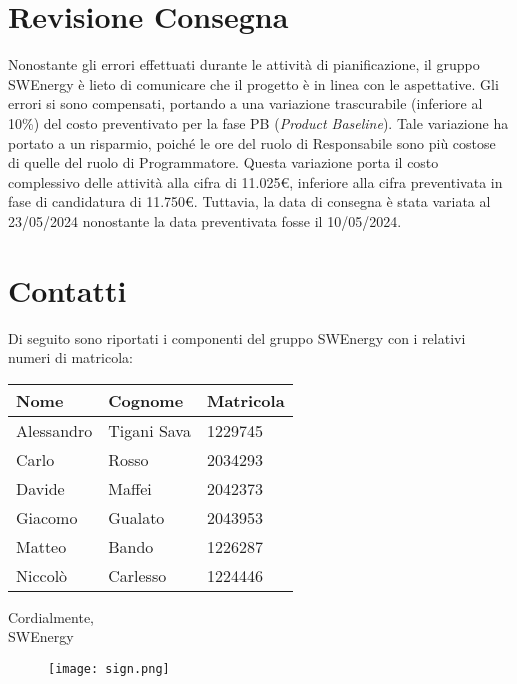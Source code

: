 \section{Revisione Consegna}

Nonostante gli errori effettuati durante le attività di pianificazione, il gruppo SWEnergy è lieto di comunicare che il progetto è in linea con le aspettative. 
Gli errori si sono compensati, portando a una variazione trascurabile (inferiore al 10\%) del costo preventivato per la fase PB (\textit{Product Baseline}). 
Tale variazione ha portato a un risparmio, poiché le ore del ruolo di Responsabile sono più costose di quelle del ruolo di Programmatore.
Questa variazione porta il costo complessivo delle attività alla cifra di 11.025€, inferiore alla cifra preventivata in fase di candidatura di 11.750€. 
Tuttavia, la data di consegna è stata variata al 23/05/2024 nonostante la data preventivata fosse il 10/05/2024.

\section{Contatti}

Di seguito sono riportati i componenti del gruppo SWEnergy con i relativi
numeri di matricola:

\begin{center}
	{
		\renewcommand{\arraystretch}{1.5}
		\begin{tabular}{lll}
			\textbf{Nome} & \textbf{Cognome} & \textbf{Matricola} \\
			\hline
			Alessandro    & Tigani Sava      & 1229745            \\
			Carlo         & Rosso            & 2034293            \\
			Davide        & Maffei           & 2042373            \\
			Giacomo       & Gualato          & 2043953            \\
			Matteo        & Bando            & 1226287            \\
			Niccolò       & Carlesso         & 1224446            \\
			\hline
		\end{tabular}
	}
\end{center}

\vspace{1cm}

\noindent
Cordialmente, \\
SWEnergy

\begin{figure}[H]
	\texttt{[image: sign.png]}
\end{figure}
